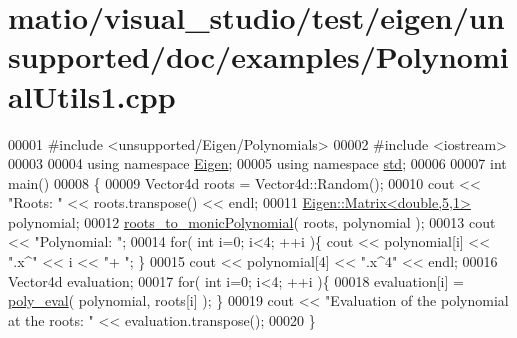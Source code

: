\hypertarget{matio_2visual__studio_2test_2eigen_2unsupported_2doc_2examples_2_polynomial_utils1_8cpp_source}{}\section{matio/visual\+\_\+studio/test/eigen/unsupported/doc/examples/\+Polynomial\+Utils1.cpp}
\label{matio_2visual__studio_2test_2eigen_2unsupported_2doc_2examples_2_polynomial_utils1_8cpp_source}

\begin{DoxyCode}
00001 \textcolor{preprocessor}{#include <unsupported/Eigen/Polynomials>}
00002 \textcolor{preprocessor}{#include <iostream>}
00003 
00004 \textcolor{keyword}{using namespace }\hyperlink{namespace_eigen}{Eigen};
00005 \textcolor{keyword}{using namespace }\hyperlink{namespacestd}{std};
00006 
00007 \textcolor{keywordtype}{int} main()
00008 \{
00009   Vector4d roots = Vector4d::Random();
00010   cout << \textcolor{stringliteral}{"Roots: "} << roots.transpose() << endl;
00011   \hyperlink{group___core___module_class_eigen_1_1_matrix}{Eigen::Matrix<double,5,1>} polynomial;
00012   \hyperlink{namespace_eigen_afbc3648f7ef67db3d5d04454fc1257fd}{roots\_to\_monicPolynomial}( roots, polynomial );
00013   cout << \textcolor{stringliteral}{"Polynomial: "};
00014   \textcolor{keywordflow}{for}( \textcolor{keywordtype}{int} i=0; i<4; ++i )\{ cout << polynomial[i] << \textcolor{stringliteral}{".x^"} << i << \textcolor{stringliteral}{"+ "}; \}
00015   cout << polynomial[4] << \textcolor{stringliteral}{".x^4"} << endl;
00016   Vector4d evaluation;
00017   \textcolor{keywordflow}{for}( \textcolor{keywordtype}{int} i=0; i<4; ++i )\{
00018     evaluation[i] = \hyperlink{namespace_eigen_adb64ffddaa9e83634e3ab0e3fd3664f5}{poly\_eval}( polynomial, roots[i] ); \}
00019   cout << \textcolor{stringliteral}{"Evaluation of the polynomial at the roots: "} << evaluation.transpose();
00020 \}
\end{DoxyCode}
